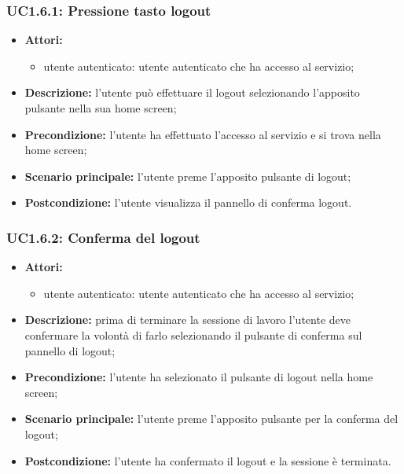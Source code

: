 \subsubsection{UC1.6.1: Pressione tasto logout}
\begin{itemize}
	\item \textbf{Attori:}
	\begin{itemize}
		\item utente autenticato: utente autenticato che ha accesso al servizio;
	\end{itemize}
	\item \textbf{Descrizione:} l'utente può effettuare il logout selezionando l'apposito pulsante nella sua home screen;
	\item \textbf{Precondizione:} l'utente ha effettuato l'accesso al servizio e si trova nella home screen;
	\item \textbf{Scenario principale:} l'utente preme l'apposito pulsante di logout;
	\item \textbf{Postcondizione:} l'utente visualizza il pannello di conferma logout.
\end{itemize}

\subsubsection{UC1.6.2: Conferma del logout}
\begin{itemize}
	\item \textbf{Attori:}
	\begin{itemize}
		\item utente autenticato: utente autenticato che ha accesso al servizio;
	\end{itemize}
	\item \textbf{Descrizione:} prima di terminare la sessione di lavoro l'utente deve confermare la volontà di farlo selezionando il pulsante di conferma sul pannello di logout;
	\item \textbf{Precondizione:} l'utente ha selezionato il pulsante di logout nella home screen;
	\item \textbf{Scenario principale:} l'utente preme l'apposito pulsante per la conferma del logout;
	\item \textbf{Postcondizione:} l'utente ha confermato il logout e la sessione è terminata.
\end{itemize}

\pagebreak



